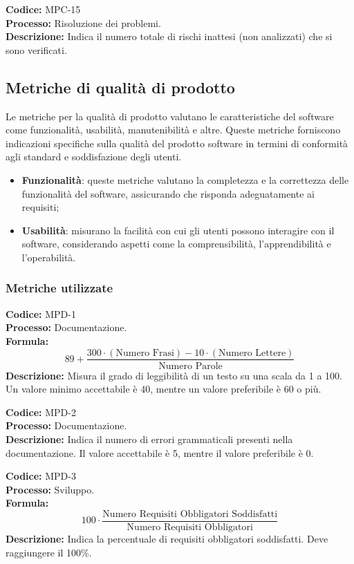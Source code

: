 \textbf{Codice:} MPC-15 \\
\textbf{Processo:} Risoluzione dei problemi. \\
\textbf{Descrizione:} Indica il numero totale di rischi inattesi (non analizzati) che si sono verificati.


\newpage
\subsection{Metriche di qualità di prodotto}
Le metriche per la qualità di prodotto valutano le caratteristiche del software come funzionalità, 
usabilità, manutenibilità e altre. Queste metriche forniscono indicazioni specifiche
sulla qualità del prodotto software in termini di conformità agli standard e soddisfazione
degli utenti.
\begin{itemize}
    \item \textbf{Funzionalità}: queste metriche valutano la completezza e la correttezza delle funzionalità del software,
    assicurando che risponda adeguatamente ai requisiti;
    \item \textbf{Usabilità}: misurano la facilità con cui gli utenti possono interagire con il software, considerando aspetti
    come la comprensibilità, l’apprendibilità e l’operabilità.
\end{itemize}

\subsubsection{Metriche utilizzate}
\textbf{Codice:} MPD-1 \\
\textbf{Processo:} Documentazione. \\
\textbf{Formula:}
\[
89 + \frac{300 \cdot (\text{Numero Frasi}) - 10 \cdot (\text{Numero Lettere})}{\text{Numero Parole}}
\]
\textbf{Descrizione:} Misura il grado di leggibilità di un testo su una scala da 1 a 100. Un valore minimo accettabile è 40, mentre un valore preferibile è 60 o più.

\textbf{Codice:} MPD-2 \\
\textbf{Processo:} Documentazione. \\
\textbf{Descrizione:} Indica il numero di errori grammaticali presenti nella documentazione. Il valore accettabile è 5, mentre il valore preferibile è 0.


\textbf{Codice:} MPD-3 \\
\textbf{Processo:} Sviluppo. \\
\textbf{Formula:}
\[
100 \cdot \frac{\text{Numero Requisiti Obbligatori Soddisfatti}}{\text{Numero Requisiti Obbligatori}}
\]
\textbf{Descrizione:} Indica la percentuale di requisiti obbligatori soddisfatti. Deve raggiungere il 100\%.

